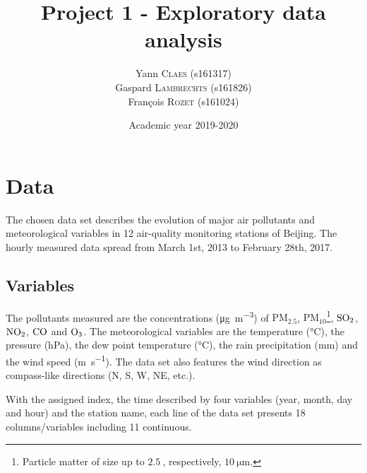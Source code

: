 \documentclass[a4paper, 12pt]{article}
\title{Project 1 - Exploratory data analysis}
\author{
Yann \textsc{Claes} (s161317)\\
Gaspard \textsc{Lambrechts} (s161826)\\
François \textsc{Rozet} (s161024)\\
}
\date{Academic year 2019-2020}
\begin{document}
	
	\section{Data}
	The chosen data set describes the evolution of major air pollutants and meteorological variables in 12 air-quality monitoring stations of Beijing. The hourly measured data spread from March 1st, 2013 to February 28th, 2017. \par
	\subsection{Variables}
	The pollutants measured are the concentrations (\si{\micro\gram\per\meter\cubed}) of $\text{PM}_{2.5}$, $\text{PM}_{10}$\footnote{Particle matter of size up to $\SI{2.5}{}$, respectively, $\SI{10}{\micro\meter}$.}, $\ce{SO2}$, $\ce{NO2}$, $\ce{CO}$ and $\ce{O3}$. The meteorological variables are the temperature (\si{\degreeCelsius}), the pressure (\si{\hecto\pascal}), the dew point temperature (\si{\degreeCelsius}), the rain precipitation (\si{\milli\meter}) and the wind speed (\si{\meter\per\second}). The data set also features the wind direction as compass-like directions (N, S, W, NE, etc.). \par
	With the assigned index, the time described by four variables (year, month, day and hour) and the station name, each line of the data set presents 18 columns/variables including 11 continuous.
\end{document}
